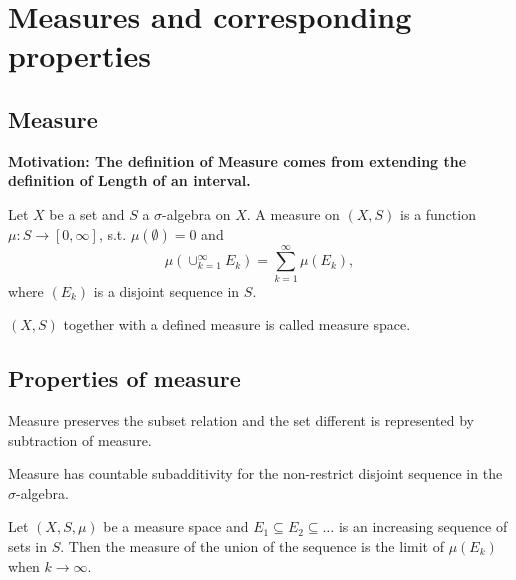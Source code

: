 \documentclass[11pt]{article}
\begin{document}
\begin{proposition}

\end{proposition}
\section{Measures and corresponding properties}
\label{sec:org71d6d03}
\subsection{Measure}
\label{sec:org23c60be}
\textbf{Motivation: The definition of Measure comes from extending the definition of Length of an interval.}

\begin{definition}[Measure]
Let \(X\) be a set and \(S\) a \(\sigma\)-algebra on \(X\). A measure on \((X,S)\) is a function \(\mu: S \to [0,\infty]\), s.t. \(\mu (\emptyset) = 0\) and
\[
\mu (\cup_{k = 1}^{\infty} E_{k}) = \sum_{k = 1}^{\infty} \mu(E_k),
\]
where \((E_k)\) is a disjoint sequence in \(S\).
\end{definition}

\begin{definition}
\((X,S)\) together with a defined measure is called measure space.
\end{definition}
\subsection{Properties of measure}
\label{sec:orgac5e90b}
\begin{proposition}[ ]
Measure preserves the subset relation and the set different is represented by subtraction of measure.
\end{proposition}

\begin{proposition}[ ]
Measure has countable subadditivity for the non-restrict disjoint sequence in the \(\sigma\)-algebra.
\end{proposition}

\begin{proposition}
Let \((X,S,\mu)\) be a measure space and \(E_1 \subseteq E_2 \subseteq \dots\) is an increasing sequence of sets in \(S\). Then the measure of the union of the sequence is the limit of \(\mu(E_k)\) when \(k \to \infty\).
\end{proposition}
\end{document}
